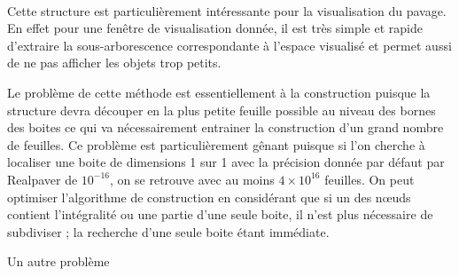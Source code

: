 \documentclass[11pt,a4paper,utf8x]{report}
\begin{document}
\paragraph{} Cette structure est particulièrement intéressante pour la visualisation du pavage. En effet pour une fenêtre de visualisation donnée, il est très simple et rapide d'extraire la sous-arborescence correspondante à l'espace visualisé et permet aussi de ne pas afficher les objets trop petits.

Le problème de cette méthode est essentiellement à la construction puisque la structure devra découper en la plus petite feuille possible au niveau des bornes des boites ce qui va nécessairement entrainer la construction d'un grand nombre de feuilles. Ce problème est particulièrement gênant puisque si l'on cherche à localiser une boite de dimensions 1 sur 1 avec la précision donnée par défaut par Realpaver de $10^{-16}$, on se retrouve avec au moins $4 \times 10^{16}$ feuilles. On peut optimiser l'algorithme de construction en considérant que si un des nœuds contient l'intégralité ou une partie d'une seule boite, il n'est plus nécessaire de subdiviser ; la recherche d'une seule boite étant immédiate.

Un autre problème
\end{document}
